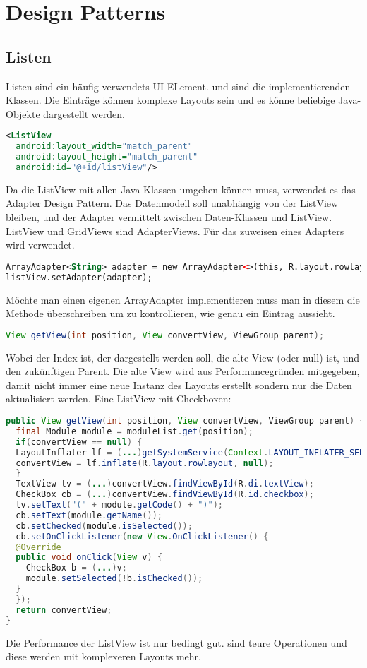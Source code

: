 \section{Design Patterns}
\subsection{Listen}
Listen sind ein häufig verwendets UI-ELement.  und  sind die implementierenden Klassen. Die Einträge können komplexe Layouts sein und es könne beliebige Java-Objekte dargestellt werden.
\begin{lstlisting}[language=xml]
<ListView
  android:layout_width="match_parent"
  android:layout_height="match_parent"
  android:id="@+id/listView"/>
\end{lstlisting}
Da die ListView mit allen Java Klassen umgehen können muss, verwendet es das Adapter Design Pattern. Das Datenmodell soll unabhängig von der ListView bleiben, und der Adapter vermittelt zwischen Daten-Klassen und ListView.\\
ListView und GridViews sind AdapterViews. Für das zuweisen eines Adapters wird  verwendet.
\begin{lstlisting}[language=xml]
ArrayAdapter<String> adapter = new ArrayAdapter<>(this, R.layout.rowlayout, R.id.label);
listView.setAdapter(adapter);
\end{lstlisting}
Möchte man einen eigenen ArrayAdapter implementieren muss man in diesem die  Methode überschreiben um zu kontrollieren, wie genau ein Eintrag aussieht.
\begin{lstlisting}[language=java]
View getView(int position, View convertView, ViewGroup parent);
\end{lstlisting}
Wobei  der Index ist, der dargestellt werden soll,  die alte View (oder null) ist, und  den zukünftigen Parent. Die alte View wird aus Performancegründen mitgegeben, damit nicht immer eine neue Instanz des Layouts erstellt sondern nur die Daten aktualisiert werden. Eine ListView mit Checkboxen:
\begin{lstlisting}[language=java]
public View getView(int position, View convertView, ViewGroup parent) {
  final Module module = moduleList.get(position);
  if(convertView == null) {
  LayoutInflater lf = (...)getSystemService(Context.LAYOUT_INFLATER_SERVICE);
  convertView = lf.inflate(R.layout.rowlayout, null);
  }
  TextView tv = (...)convertView.findViewById(R.di.textView);
  CheckBox cb = (...)convertView.findViewById(R.id.checkbox);
  tv.setText("(" + module.getCode() + ")");
  cb.setText(module.getName());
  cb.setChecked(module.isSelected());
  cb.setOnClickListener(new View.OnClickListener() {
  @Override
  public void onClick(View v) {
    CheckBox b = (...)v;
    module.setSelected(!b.isChecked());
  }
  });
  return convertView;
}
\end{lstlisting}
Die Performance der ListView ist nur bedingt gut.  sind teure Operationen und diese werden mit komplexeren Layouts mehr. 
